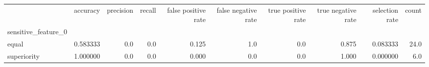 \begin{tabular}{lrrrrrrrrr}
\toprule
{} &  accuracy &  precision &  recall &  false positive rate &  false negative rate &  true positive rate &  true negative rate &  selection rate &  count \\
sensitive\_feature\_0 &           &            &         &                      &                      &                     &                     &                 &        \\
\midrule
equal               &  0.583333 &        0.0 &     0.0 &                0.125 &                  1.0 &                 0.0 &               0.875 &        0.083333 &   24.0 \\
superiority         &  1.000000 &        0.0 &     0.0 &                0.000 &                  0.0 &                 0.0 &               1.000 &        0.000000 &    6.0 \\
\bottomrule
\end{tabular}
